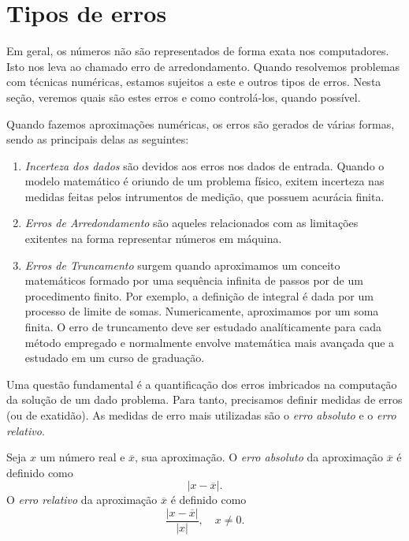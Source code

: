 \section{Tipos de erros}

Em geral, os números não são representados de forma exata nos computadores. Isto nos leva ao chamado erro de arredondamento. Quando resolvemos problemas com técnicas numéricas, estamos sujeitos a este e outros tipos de erros. Nesta seção, veremos quais são estes erros e como controlá-los, quando possível.

Quando fazemos aproximações numéricas, os erros são gerados de várias formas, sendo as principais delas as seguintes:
\begin{enumerate}
 \item \emph{Incerteza dos dados} são devidos aos erros nos dados de entrada. Quando o modelo matemático é oriundo de um problema físico, exitem incerteza nas medidas feitas pelos intrumentos de medição, que possuem acurácia finita.
 \item \emph{Erros de Arredondamento} são aqueles relacionados com as limitações exitentes na forma representar números em máquina. 
 \item \emph{Erros de Truncamento} surgem quando aproximamos um conceito matemáticos formado por uma sequência infinita de passos por de um procedimento finito. Por exemplo, a definição de integral é dada por um processo de limite de somas. Numericamente, aproximamos por um soma finita. O erro de truncamento deve ser estudado analíticamente para cada método empregado e normalmente envolve matemática mais avançada que a estudado em um curso de graduação. 
\end{enumerate}

Uma questão fundamental é a quantificação dos erros imbricados na computação da solução de um dado problema. Para tanto, precisamos definir medidas de erros (ou de exatidão). As medidas de erro mais utilizadas são o \emph{erro absoluto} e o \emph{erro relativo}.

\begin{defn} Seja $x$ um número real e $\overline{x}$, sua aproximação. O \emph{erro absoluto} da aproximação $\overline{x}$ é definido como
  \begin{equation*}
    |x-\overline{x}|.
  \end{equation*}
O \emph{erro relativo} da aproximação $\overline{x}$ é definido como
\begin{equation*}
\frac{|x-\overline{x}|}{|x|},\quad x\neq 0.
\end{equation*}
\end{defn}

